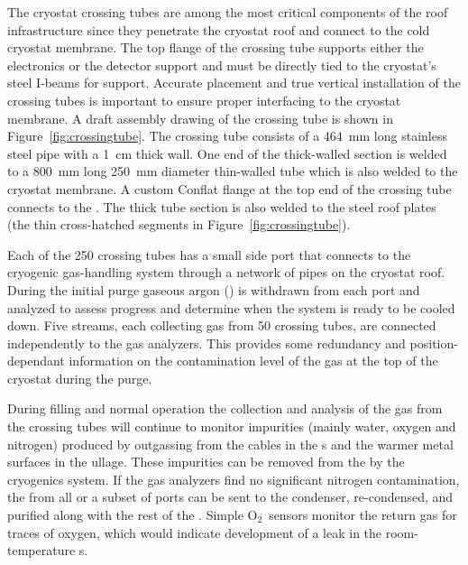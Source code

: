 The cryostat crossing tubes are among the most critical components of the roof infrastructure since they penetrate the cryostat roof and connect to the cold cryostat membrane. The top flange of the crossing tube supports either the electronics \fdth or the detector support \fdth and must be directly tied to the cryostat's steel I-beams for support. 
Accurate placement and true vertical installation of the crossing tubes is important to ensure proper interfacing to the cryostat membrane. 
A draft assembly drawing of the crossing tube is shown in Figure~\ref{fig:crossingtube}. 
The crossing tube consists of a \SI{464}{mm} long stainless steel pipe with a \SI{1}{cm} thick wall. 
One end of the thick-walled section is welded to a \SI{800}{mm} long \SI{250}{mm} diameter thin-walled tube which is also welded to the cryostat membrane.
A custom Conflat flange at the top end of the crossing tube connects to the \fdth. 
The thick tube section is also welded to the steel roof plates (the thin cross-hatched segments in Figure~\ref{fig:crossingtube}).  

 
Each of the 250 crossing tubes has a small side port that connects to the cryogenic gas-handling system through a network of pipes on the cryostat roof. During the initial purge gaseous argon () is withdrawn from each port and analyzed to assess progress and determine when the system is ready to be cooled down. Five  streams, each collecting gas from 50 crossing tubes, are connected independently to the gas analyzers. This provides some redundancy and position-dependant information on the contamination level of the gas at the top of the cryostat during the purge.
 
During filling and normal operation the collection and analysis of the gas from the crossing tubes will continue to monitor impurities (mainly water, oxygen and nitrogen) produced by outgassing from the cables in the \fdth{}s and the warmer metal surfaces in the ullage. These impurities can be removed from the  by the cryogenics system.
If the gas analyzers find no significant nitrogen contamination, the  from all or a subset of ports can be sent to the condenser, re-condensed, and purified along with the rest of the . Simple O$_2$\ sensors monitor the return gas for traces of oxygen, which would indicate development of a leak in the room-temperature \fdth{}s.

